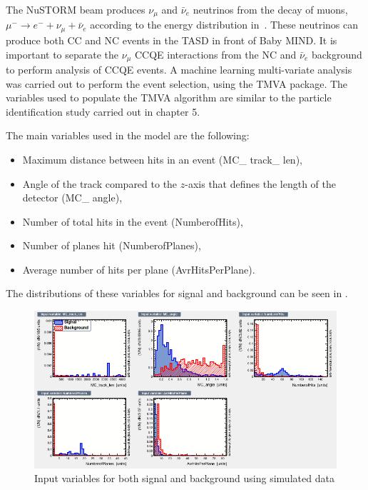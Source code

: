The NuSTORM beam produces $\nu_\mu$ and $\bar{\nu}_e$ neutrinos from the decay of muons, $ \mu^- \rightarrow e^- + \nu_\mu + \bar{\nu}_e $ according to the energy distribution in~. These neutrinos can produce both CC and NC events in the TASD in front of Baby MIND. It is important to separate the $\nu_\mu$ CCQE interactions from the NC and $\bar{\nu}_e$ background to perform analysis of CCQE events. A machine learning multi-variate analysis was carried out to perform the event selection, using the TMVA package. The variables used to populate the TMVA algorithm are similar to the particle identification study carried out in chapter 5.


The main variables used in the model are the following:
\begin{itemize}
\item Maximum distance between hits in an event (MC\_ track\_ len),
\item Angle of the track compared to the $z$-axis that defines the length of the detector (MC\_ angle),
\item Number of total hits in the event (NumberofHits),
\item Number of planes hit (NumberofPlanes),
\item Average number of hits per plane (AvrHitsPerPlane).
\end{itemize}

The distributions of these variables for signal and background can be seen in .


\begin{figure}[h!]
\centering

\includegraphics[width=\textwidth]{figures/neutrinoTMVA/variables_id_c1.png}
\caption{Input variables for both signal and background using simulated data}
\label{fig:TMVANeuinput}
\end{figure}

